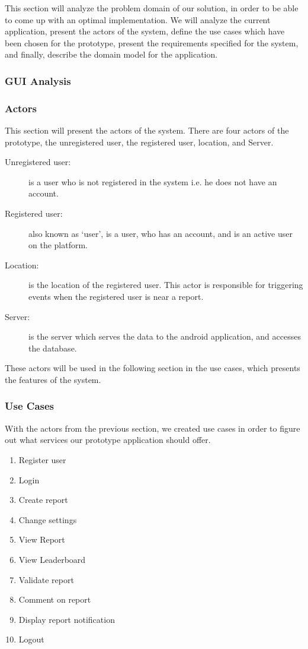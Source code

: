 
This section will analyze the problem domain of our solution, in order to be able to come up with an optimal implementation. We will analyze the current application, present the actors of the system, define the use cases which have been chosen for the prototype, present the requirements specified for the system, and finally, describe the domain model for the application.


\subsubsection{GUI Analysis}
\subsubsection{Actors}
This section will present the actors of the system. There are four actors of the prototype, the unregistered user, the registered user, location, and Server.

\begin{description}
\item [Unregistered user:] is a user who is not registered in the system i.e. he does not have an account.
\item [Registered user:] also known as ‘user’, is a user, who has an account, and is an active user on the platform.
\item [Location:] is the location of the registered user. This actor is responsible for triggering events when the registered user is near a report.
\item [Server:] is the server which serves the data to the android application, and accesses the database.
\end{description}
These actors will be used in the following section in the use cases, which presents the features of the system.


\subsubsection{Use Cases}
With the actors from the previous section, we created use cases in order to figure out what services our prototype application should offer.

\begin{enumerate}[label=UC\arabic*]
\item Register user
\item Login
\item Create report
\item Change settings
\item View Report
\item View Leaderboard
\item Validate report
\item Comment on report
\item Display report notification
\item Logout
\end{enumerate}

